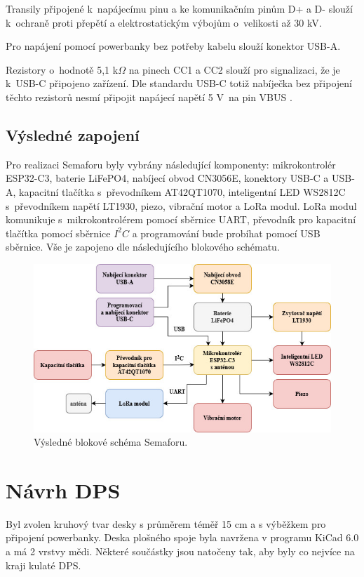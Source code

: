 Transily připojené k~napájecímu pinu a ke komunikačním pinům D+ a D- slouží k~ochraně proti přepětí a elektrostatickým výbojům o~velikosti až 30 kV. 

Pro napájení pomocí powerbanky bez potřeby kabelu slouží konektor USB-A. 

Rezistory o~hodnotě 5,1 k$\Omega$ na pinech CC1 a CC2 slouží pro signalizaci, že je k~USB-C připojeno zařízení. Dle standardu USB-C totiž nabíječka bez 
připojení těchto rezistorů nesmí připojit napájecí napětí 5 V~na pin VBUS \cite{USB-C}. 


\section{Výsledné zapojení}
Pro realizaci Semaforu byly vybrány následující komponenty: mikrokontrolér ESP32-C3, baterie LiFePO4, nabíjecí obvod CN3056E, konektory USB-C a USB-A,
kapacitní tlačítka s~převodníkem AT42QT1070, inteligentní LED WS2812C s~převodníkem napětí LT1930, piezo, vibrační motor a LoRa modul. LoRa modul komunikuje 
s~mikrokontrolérem pomocí sběrnice UART, převodník pro kapacitní tlačítka pomocí sběrnice $I^2C$ a programování bude probíhat pomocí USB sběrnice. Vše je 
zapojeno dle následujícího blokového schématu. 

\begin{figure}[!h]
  \begin{center}
    \includegraphics[scale=0.65]{obrazky/vysledne_blokove_schema.jpg}
  \end{center}
  \caption[Výsledné blokové schéma Semaforu]{Výsledné blokové schéma Semaforu.}
\end{figure}




\chapter{Návrh DPS}
Byl zvolen kruhový tvar desky s průměrem téměř 15 cm a s výběžkem pro připojení powerbanky. Deska plošného spoje byla navržena v programu KiCad 6.0 a má 2 vrstvy mědi. 
Některé součástky jsou natočeny tak, aby byly co nejvíce na kraji kulaté DPS.

